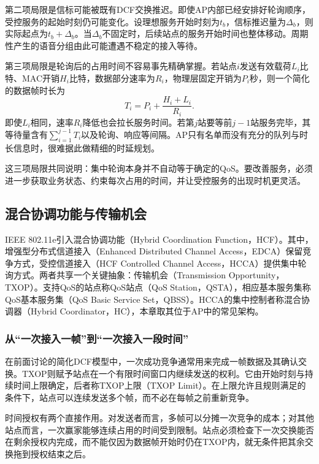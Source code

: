 第二项局限是信标可能被既有DCF交换推迟。即使AP内部已经安排好轮询顺序，受控服务的起始时刻仍可能变化。设理想服务开始时刻为$t_b$，信标推迟量为$\Delta_b$，则实际起点为$t_b+\Delta_b$。当$\Delta_b$不固定时，后续站点的服务开始时间也整体移动。周期性产生的语音分组由此可能遭遇不稳定的接入等待。

第三项局限是轮询后的占用时间不容易事先精确掌握。若站点$i$发送有效载荷$L_i$比特、MAC开销$H_i$比特，数据部分速率为$R_i$，物理层固定开销为$P_i$秒，则一个简化的数据帧时长为
\begin{equation}
T_i=P_i+\frac{H_i+L_i}{R_i}.
\end{equation}
即使$L_i$相同，速率$R_i$降低也会拉长服务时间。若第$j$站要等前$j-1$站服务完毕，其等待量含有$\sum_{i=1}^{j-1}T_i$以及轮询、响应等间隔。AP只有名单而没有充分的队列与时长信息时，很难据此做精细的时延规划。

这三项局限共同说明：集中轮询本身并不自动等于确定的QoS。要改善服务，必须进一步获取业务状态、约束每次占用的时间，并让受控服务的出现时机更灵活。

\subsection{混合协调功能与传输机会}

IEEE 802.11e引入混合协调功能（Hybrid Coordination Function，HCF）。其中，增强型分布式信道接入（Enhanced Distributed Channel Access，EDCA）保留竞争方式，受控信道接入（HCF Controlled Channel Access，HCCA）提供集中轮询方式。两者共享一个关键抽象：传输机会（Transmission Opportunity，TXOP）。支持QoS的站点称QoS站点（QoS Station，QSTA），相应基本服务集称QoS基本服务集（QoS Basic Service Set，QBSS）。HCCA的集中控制者称混合协调器（Hybrid Coordinator，HC），本章取其位于AP中的常见架构。

\subsubsection{从“一次接入一帧”到“一次接入一段时间”}

在前面讨论的简化DCF模型中，一次成功竞争通常用来完成一帧数据及其确认交换。TXOP则赋予站点在一个有限时间窗口内继续发送的权利。它由开始时刻与持续时间上限确定，后者称TXOP上限（TXOP Limit）。在上限允许且规则满足的条件下，站点可以连续发送多个帧，而不必在每帧之前重新竞争。

时间授权有两个直接作用。对发送者而言，多帧可以分摊一次竞争的成本；对其他站点而言，一次赢家能够连续占用的时间受到限制。站点必须检查下一次交换能否在剩余授权内完成，而不能仅因为数据帧开始时仍在TXOP内，就无条件把其余交换拖到授权结束之后。

